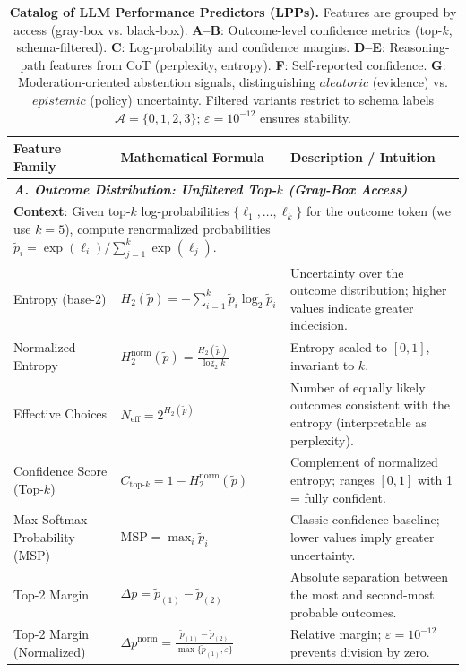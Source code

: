 \begin{table}[t]
\centering
\caption{\textbf{Catalog of LLM Performance Predictors (LPPs).} Features are grouped by access (gray-box vs. black-box). \textbf{A--B}: Outcome-level confidence metrics (top-$k$, schema-filtered). \textbf{C}: Log-probability and confidence margins. \textbf{D--E}: Reasoning-path features from CoT (perplexity, entropy). \textbf{F}: Self-reported confidence. \textbf{G}: Moderation-oriented abstention signals, distinguishing $\textit{aleatoric}$ (evidence) vs. $\textit{epistemic}$ (policy) uncertainty. Filtered variants restrict to schema labels $\mathcal{A}=\{0,1,2,3\}$; $\varepsilon=10^{-12}$ ensures stability.}
\small
\begin{tabular}{p{4.0cm} p{4.8cm} p{8.2cm}}
\toprule
\textbf{Feature Family} & \textbf{Mathematical Formula} & \textbf{Description / Intuition} \\
\midrule
\multicolumn{3}{l}{\textit{\textbf{A. Outcome Distribution: Unfiltered Top-$k$ (Gray-Box Access)}}} \\
\multicolumn{3}{p{17.0cm}}{\small \textbf{Context}: Given top-$k$ log-probabilities $\{\ell_1, \ldots, \ell_k\}$ for the outcome token (we use $k{=}5$), compute renormalized probabilities $\tilde{p}_i = \exp(\ell_i) / \sum_{j=1}^k \exp(\ell_j)$.} \\[0.5ex]
\hdashline
Entropy (base-2) & $H_2(\tilde{p}) = -\sum_{i=1}^k \tilde{p}_i \log_2 \tilde{p}_i$ & Uncertainty over the outcome distribution; higher values indicate greater indecision. \\
Normalized Entropy & $H_2^{\text{norm}}(\tilde{p}) = \frac{H_2(\tilde{p})}{\log_2 k}$ & Entropy scaled to $[0,1]$, invariant to $k$. \\
Effective Choices & $N_{\text{eff}} = 2^{H_2(\tilde{p})}$ & Number of equally likely outcomes consistent with the entropy (interpretable as perplexity). \\
Confidence Score (Top-$k$) & $C_{\text{top-}k} = 1 - H_2^{\text{norm}}(\tilde{p})$ & Complement of normalized entropy; ranges $[0,1]$ with 1 = fully confident. \\
Max Softmax Probability (MSP) & $\text{MSP} = \max_{i} \tilde{p}_i$ & Classic confidence baseline; lower values imply greater uncertainty. \\
Top-2 Margin & $\Delta p = \tilde{p}_{(1)} - \tilde{p}_{(2)}$ & Absolute separation between the most and second-most probable outcomes. \\
Top-2 Margin (Normalized) & $\Delta p^{\text{norm}} = \frac{\tilde{p}_{(1)} - \tilde{p}_{(2)}}{\max\{\tilde{p}_{(1)}, \varepsilon\}}$ & Relative margin; $\varepsilon{=}10^{-12}$ prevents division by zero. \\

\end{tabular}
\end{table}
